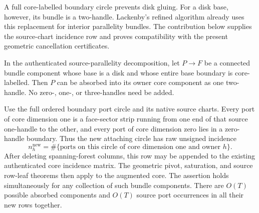 A full core-labelled boundary circle prevents disk gluing.  For a disk base,
however, its bundle is a two-handle.  Lackenby's refined algorithm already uses
this replacement for interior parallelity bundles\cite[Section~10, step~$(2')$]{Lackenby2026}.
The contribution below supplies the source-chart incidence row and proves
compatibility with the present geometric cancellation certificates.

\begin{proposition}
\label{geo:prop-annulus-absorption}
In the authenticated source-parallelity decomposition, let $P\to F$ be a
connected bundle component whose base is a disk and whose entire base
boundary is core-labelled.  Then $P$ can be absorbed into its owner core
component as one two-handle.  No zero-, one-, or three-handles need be
added.

Use the full ordered boundary port circle and its native source charts.
Every port of core dimension one is a face-sector strip running from one
end of that source one-handle to the other, and every port of core dimension
zero lies in a zero-handle boundary.  Thus the new attaching circle has
raw unsigned incidence
\[
 n^{\mathrm{new}}_h
 =\#\{\text{ports on this circle of core dimension one and owner }h\}.
 \tag{G9}\label{geo:eq-absorbed-row}
\]
After deleting spanning-forest columns, this row may be appended to the
existing authenticated core incidence matrix.  The geometric pivot,
saturation, and source row-leaf theorems then apply to the augmented core.
The assertion holds simultaneously for any collection of such bundle
components.  There are $O(T)$ possible absorbed components and $O(T)$
source port occurrences in all their new rows together.
\end{proposition}

